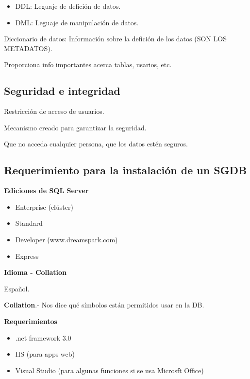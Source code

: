 \documentclass{article}
\begin{document}
\begin{itemize}
	\item
		DDL: Leguaje de defición de datos.
	\item
		DML: Leguaje de manipulación de datos.
\end{itemize}

Diccionario de datos: Información sobre la defición de los datos (SON LOS
METADATOS).

Proporciona info importantes acerca tablas, usarios, etc.

\subsection{Seguridad e integridad}

Restricción de acceso de usuarios.

Mecanismo creado para garantizar la seguridad.

Que no acceda cualquier persona, que los datos estén seguros.

\subsection{Requerimiento para la instalación de un SGDB}

\textbf{Ediciones de SQL Server}

\begin{itemize}
	\item
		Enterprise (clúster)
	\item
		Standard
	\item
		Developer (www.dreamspark.com)
	\item
		Express
\end{itemize}

\vspace{1em}
\textbf{Idioma - Collation}

Español.

\vspace{1em}
\textbf{Collation}.- Nos dice qué símbolos están permitidos usar en la DB.

\vspace{1em}
\textbf{Requerimientos}

\begin{itemize}
	\item
		.net framework 3.0
	\item
		IIS (para apps web)
	\item
		Visual Studio (para algunas funciones si se usa Microsft Office)
\end{itemize}
\end{document}
